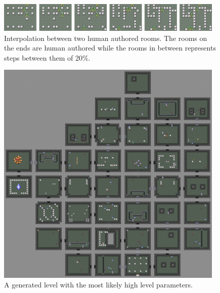 \documentclass[a4paper]{article}
\begin{document}
\begin{figure}[ht]
\centering
    \includegraphics[width=0.97\textwidth]{figures/PCAInterp.png}
    \caption{Interpolation between two human authored rooms.  The rooms on the ends are human authored while the rooms in between represents steps between them of 20\%.}
  \label{fig:PCAinterp}
\end{figure}

\begin{figure}[ht]
\centering
    \includegraphics[width=0.97\textwidth]{figures/lttp1.png}
    \caption{A generated level with the most likely high level parameters.}
  \label{fig:dungeon}
\end{figure}
\end{document}
